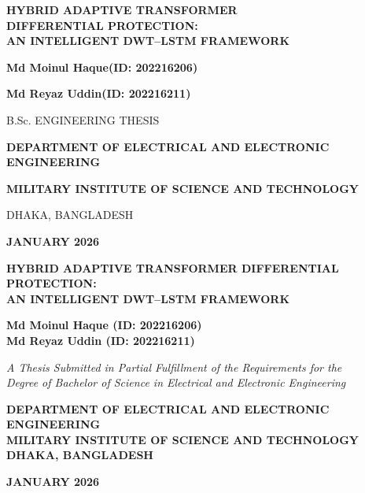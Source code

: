 \documentclass[12pt,a4paper,oneside]{report}
\begin{document}
\begin{titlepage}
\centering
\vspace*{0.6in}
{\LARGE\bfseries HYBRID ADAPTIVE TRANSFORMER\\[2pt] DIFFERENTIAL PROTECTION:\\[6pt] AN INTELLIGENT DWT--LSTM FRAMEWORK\par}
\vfill
{\large\bfseries Md Moinul Haque\quad(ID: 202216206)\par}
\vspace{4pt}
{\large\bfseries Md Reyaz Uddin\quad(ID: 202216211)\par}
\vspace{0.5in}
{\large B.Sc. ENGINEERING THESIS\par}
\vfill
{\bfseries DEPARTMENT OF ELECTRICAL AND ELECTRONIC ENGINEERING\par}
{\bfseries MILITARY INSTITUTE OF SCIENCE AND TECHNOLOGY\par}
{DHAKA, BANGLADESH\par}
\vspace{0.35in}
{\large\bfseries JANUARY 2026\par}
\end{titlepage}


\thispagestyle{fancy}
\begin{center}
\vspace*{0.4in}
{\large\bfseries HYBRID ADAPTIVE TRANSFORMER DIFFERENTIAL PROTECTION:\\ AN INTELLIGENT DWT--LSTM FRAMEWORK\par}
\vspace{0.5in}
{\bfseries Md Moinul Haque (ID: 202216206)\\[2pt] Md Reyaz Uddin (ID: 202216211)\par}
\vspace{0.4in}
\textit{A Thesis Submitted in Partial Fulfillment of the Requirements for the\\ Degree of Bachelor of Science in Electrical and Electronic Engineering}\par
\vspace{0.6in}
{\bfseries DEPARTMENT OF ELECTRICAL AND ELECTRONIC ENGINEERING\\ MILITARY INSTITUTE OF SCIENCE AND TECHNOLOGY\\ DHAKA, BANGLADESH\par}
\vspace{0.3in}
{\bfseries JANUARY 2026\par}
\end{center}
\end{document}
